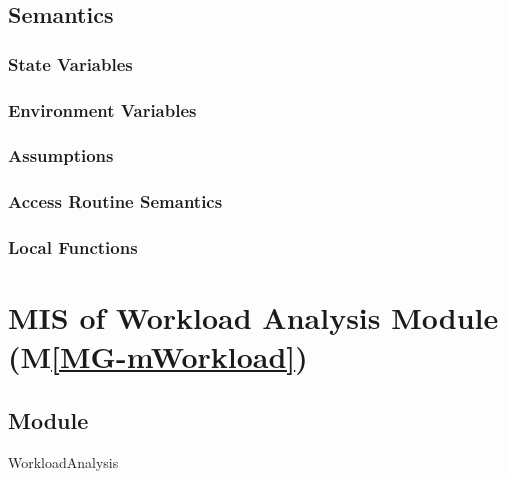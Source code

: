 \documentclass[12pt, titlepage]{article}
\newcommand{\mref}[1]{M\ref{MG-#1}}
\begin{document}
\subsection{Semantics}

\subsubsection{State Variables}


\subsubsection{Environment Variables}


\subsubsection{Assumptions}


\subsubsection{Access Routine Semantics}


\subsubsection{Local Functions}


\newpage

\section{MIS of Workload Analysis Module (\mref{mWorkload})} \label{mis-mWorkload}

\subsection{Module}
WorkloadAnalysis
\end{document}
